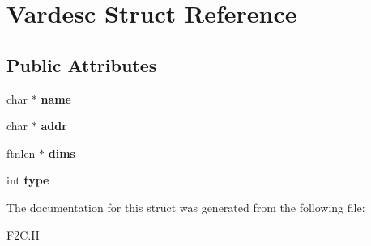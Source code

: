 \hypertarget{struct_vardesc}{\section{Vardesc Struct Reference}
\label{struct_vardesc}
}
\subsection*{Public Attributes}
\begin{DoxyCompactItemize}
\item 
\hypertarget{struct_vardesc_a9dcb9122e28bfb7d88caed2ffa38f1ad}{char $\ast$ {\bfseries name}}\label{struct_vardesc_a9dcb9122e28bfb7d88caed2ffa38f1ad}

\item 
\hypertarget{struct_vardesc_abc6f3753ac54741fafe32fcc744993ab}{char $\ast$ {\bfseries addr}}\label{struct_vardesc_abc6f3753ac54741fafe32fcc744993ab}

\item 
\hypertarget{struct_vardesc_a7be667d06905f6c6463ede740ed242ec}{ftnlen $\ast$ {\bfseries dims}}\label{struct_vardesc_a7be667d06905f6c6463ede740ed242ec}

\item 
\hypertarget{struct_vardesc_ac901f905f9cf2c9011684b7e612cc16c}{int {\bfseries type}}\label{struct_vardesc_ac901f905f9cf2c9011684b7e612cc16c}

\end{DoxyCompactItemize}


The documentation for this struct was generated from the following file\+:\begin{DoxyCompactItemize}
\item 
F2\+C.\+H\end{DoxyCompactItemize}

